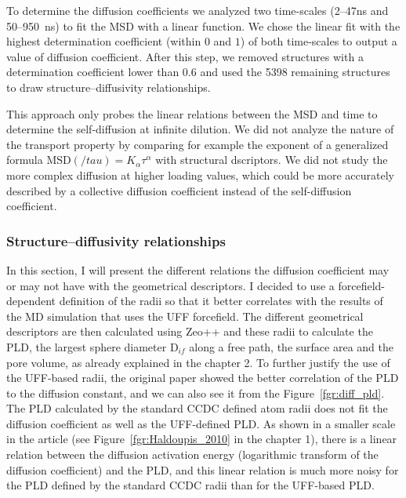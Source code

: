 \documentclass[main]{subfiles}
\begin{document}
To determine the diffusion coefficients we analyzed two time-scales (2--47\si{\ns} and 50--950~\si{\ns}) to fit the MSD with a linear function. We chose the linear fit with the highest determination coefficient (within $0$ and $1$) of both time-scales to output a value of diffusion coefficient. After this step, we removed structures with a determination coefficient lower than $0.6$ and used the 5398 remaining structures to draw structure--diffusivity relationships. 

This approach only probes the linear relations between the MSD and time to determine the self-diffusion at infinite dilution. We did not analyze the nature of the transport property by comparing for example the exponent of a generalized formula $\text{MSD}(/tau) = K_\alpha\tau^\alpha$ with structural dscriptors. We did not study the more complex diffusion at higher loading values, which could be more accurately described by a collective diffusion coefficient instead of the self-diffusion coefficient. 

\subsubsection{Structure--diffusivity relationships}

In this section, I will present the different relations the diffusion coefficient may or may not have with the geometrical descriptors. I decided to use a forcefield-dependent definition of the radii so that it better correlates with the results of the MD simulation that uses the UFF forcefield. The different geometrical descriptors are then calculated using Zeo++ and these radii to calculate the PLD, the largest sphere diameter D$_{if}$ along a free path, the surface area and the pore volume, as already explained in the chapter 2. To further justify the use of the UFF-based radii, the original paper \cite{Hung_2021} showed the better correlation of the PLD to the diffusion constant, and we can also see it from the Figure~\ref{fgr:diff_pld}. The PLD calculated by the standard CCDC defined atom radii does not fit the diffusion coefficient as well as the UFF-defined PLD. As shown in a smaller scale in the article \cite{Haldoupis_2010} (see Figure~\ref{fgr:Haldoupis_2010} in the chapter 1), there is a linear relation between the diffusion activation energy (logarithmic transform of the diffusion coefficient) and the PLD, and this linear relation is much more noisy for the PLD defined by the standard CCDC radii than for the UFF-based PLD.
\end{document}

